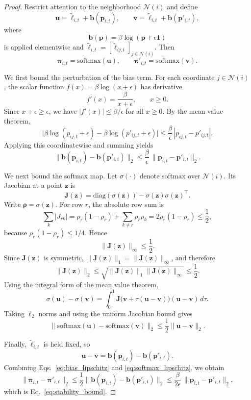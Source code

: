 \documentclass[preprint,12pt]{elsarticle}
\newtheorem{proof}{Proof}
\begin{document}
\begin{proof}
Restrict attention to the neighborhood $\mathcal{N}(i)$ and define
\[
\mathbf{u}
=
\tilde{\boldsymbol{\ell}}_{i,t}
+
\mathbf{b}(\mathbf{p}_{i,t}),
\qquad
\mathbf{v}
=
\tilde{\boldsymbol{\ell}}_{i,t}
+
\mathbf{b}(\mathbf{p}'_{i,t}),
\]
where
\[
\mathbf{b}(\mathbf{p})
=
\beta\log(\mathbf{p}+\epsilon\mathbf{1})
\]
is applied elementwise and
$\tilde{\boldsymbol{\ell}}_{i,t}=[\tilde{\ell}_{ij,t}]_{j\in\mathcal{N}(i)}$.
Then
\[
\boldsymbol{\pi}_{i,t}=\mathrm{softmax}(\mathbf{u}),
\qquad
\boldsymbol{\pi}'_{i,t}=\mathrm{softmax}(\mathbf{v}).
\]

We first bound the perturbation of the bias term.
For each coordinate $j\in\mathcal{N}(i)$, the scalar function
$f(x)=\beta\log(x+\epsilon)$ has derivative
\[
f'(x)=\frac{\beta}{x+\epsilon},
\qquad x\ge 0.
\]
Since $x+\epsilon\ge\epsilon$, we have $|f'(x)|\le \beta/\epsilon$ for all $x\ge 0$.
By the mean value theorem,
\[
\bigl|\beta\log(p_{ij,t}+\epsilon)-\beta\log(p'_{ij,t}+\epsilon)\bigr|
\le
\frac{\beta}{\epsilon}\,|p_{ij,t}-p'_{ij,t}|.
\]
Applying this coordinatewise and summing yields
\begin{equation}
\|\mathbf{b}(\mathbf{p}_{i,t})-\mathbf{b}(\mathbf{p}'_{i,t})\|_2
\le
\frac{\beta}{\epsilon}\,
\|\mathbf{p}_{i,t}-\mathbf{p}'_{i,t}\|_2.
\label{eq:bias_lipschitz}
\end{equation}

We next bound the softmax map.
Let $\sigma(\cdot)$ denote softmax over $\mathcal{N}(i)$.
Its Jacobian at a point $\mathbf{z}$ is
\[
\mathbf{J}(\mathbf{z})
=
\mathrm{diag}(\sigma(\mathbf{z}))
-
\sigma(\mathbf{z})\sigma(\mathbf{z})^\top.
\]
Write $\boldsymbol{\rho}=\sigma(\mathbf{z})$.
For row $r$, the absolute row sum is
\[
\sum_{k}|J_{rk}|
=
\rho_r(1-\rho_r)+\sum_{k\neq r}\rho_r\rho_k
=
2\rho_r(1-\rho_r)
\le
\frac{1}{2},
\]
because $\rho_r(1-\rho_r)\le 1/4$.
Hence
\[
\|\mathbf{J}(\mathbf{z})\|_\infty \le \frac{1}{2}.
\]
Since $\mathbf{J}(\mathbf{z})$ is symmetric, $\|\mathbf{J}(\mathbf{z})\|_1=\|\mathbf{J}(\mathbf{z})\|_\infty$, and therefore
\[
\|\mathbf{J}(\mathbf{z})\|_2
\le
\sqrt{\|\mathbf{J}(\mathbf{z})\|_1\|\mathbf{J}(\mathbf{z})\|_\infty}
\le
\frac{1}{2}.
\]
Using the integral form of the mean value theorem,
\[
\sigma(\mathbf{u})-\sigma(\mathbf{v})
=
\int_0^1
\mathbf{J}\!\bigl(\mathbf{v}+\tau(\mathbf{u}-\mathbf{v})\bigr)
(\mathbf{u}-\mathbf{v})\,d\tau .
\]
Taking $\ell_2$ norms and using the uniform Jacobian bound gives
\begin{equation}
\|\mathrm{softmax}(\mathbf{u})-\mathrm{softmax}(\mathbf{v})\|_2
\le
\frac{1}{2}\|\mathbf{u}-\mathbf{v}\|_2 .
\label{eq:softmax_lipschitz}
\end{equation}

Finally, $\tilde{\boldsymbol{\ell}}_{i,t}$ is held fixed, so
\[
\mathbf{u}-\mathbf{v}
=
\mathbf{b}(\mathbf{p}_{i,t})-\mathbf{b}(\mathbf{p}'_{i,t}).
\]
Combining Eqs.~\eqref{eq:bias_lipschitz} and \eqref{eq:softmax_lipschitz}, we obtain
\[
\|\boldsymbol{\pi}_{i,t}-\boldsymbol{\pi}'_{i,t}\|_2
\le
\frac{1}{2}
\|\mathbf{b}(\mathbf{p}_{i,t})-\mathbf{b}(\mathbf{p}'_{i,t})\|_2
\le
\frac{\beta}{2\epsilon}\,
\|\mathbf{p}_{i,t}-\mathbf{p}'_{i,t}\|_2,
\]
which is Eq.~\eqref{eq:stability_bound}.
\end{proof}
\end{document}
